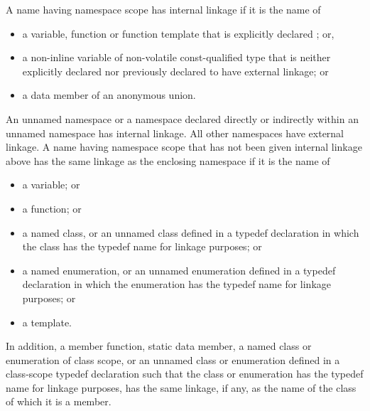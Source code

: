 \pnum
{}%
%
%
%
%
%
A name having namespace scope has internal
linkage if it is the name of
\begin{itemize}
\item
  a variable, function or function template that is
  explicitly declared ; or,
\item
  a non-inline variable of non-volatile const-qualified type that is
  neither explicitly declared  nor previously
  declared to have external linkage; or
\item
  a data member of an anonymous union.
\end{itemize}

\pnum
An unnamed namespace or a namespace declared directly or indirectly within an
unnamed namespace has internal linkage. All other namespaces have external linkage.
A name having namespace scope
that has not been given internal linkage above
has the same linkage as the enclosing namespace if it is the name of
\begin{itemize}
\item a variable; or
\item a function; or
\item {}%
a named class, or an unnamed class defined in a
typedef declaration in which the class has the typedef name for linkage
purposes; or
\item {}%
a named enumeration, or an unnamed enumeration defined
in a typedef declaration in which the enumeration has the typedef name
for linkage purposes; or
\item a template.
\end{itemize}

\pnum
In addition, a member function, static data member, a named class or
enumeration of class scope, or an unnamed class or enumeration defined
in a class-scope typedef declaration such that the class or enumeration
has the typedef name for linkage purposes, has
the same linkage, if any, as the name of the class of which it is a
member.

